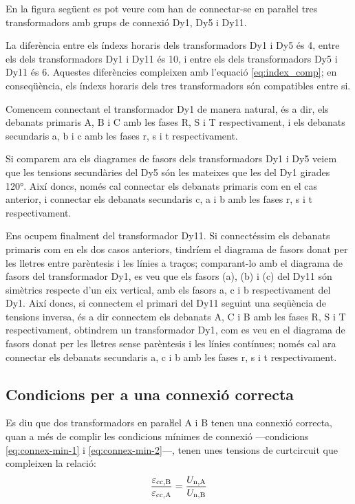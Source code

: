 \begin{exemple}[\ConnexParalDifIndex{}]
	\addcontentsxms{\ConnexParalDifIndex}
    En la figura següent es pot veure com han de connectar-se en paraŀlel tres transformadors amb grups de connexió Dy1, Dy5 i Dy11.

	 \begin{center}
		
	\end{center}

      La diferència entre els índexs horaris dels transformadors Dy1 i Dy5 és 4, entre els dels transformadors Dy1 i Dy11 és 10, i entre els dels transformadors Dy5 i Dy11 és 6. Aquestes diferències compleixen amb l'equació \eqref{eq:index_comp}; en conseqüència, els índexs horaris dels tres transformadors són compatibles entre si.


    Comencem connectant el  transformador Dy1 de manera natural, és a dir, els debanats primaris A, B i C amb les fases R, S i T respectivament, i els debanats secundaris a, b i c amb les fases r, s i t respectivament.

  

    Si comparem ara els diagrames de fasors dels transformadors Dy1 i Dy5 veiem que les tensions secundàries del Dy5 són les mateixes que les del Dy1 girades \ang{120}. Així doncs, només  cal connectar els debanats primaris com en el cas anterior, i connectar els debanats secundaris c, a i b amb les fases r, s i t respectivament.


    Ens ocupem finalment del transformador Dy11. Si connectéssim els debanats primaris com en els dos casos anteriors, tindríem el diagrama de fasors donat per les lletres entre parèntesis i les línies a traços; comparant-lo amb el diagrama de fasors del transformador Dy1, es veu que els fasors (a), (b) i (c) del Dy11 són simètrics respecte d'un eix vertical, amb els fasors a, c i b respectivament del Dy1. Així doncs, si connectem el primari del Dy11 seguint una seqüència de tensions inversa, és a dir connectem els debanats A, C i B amb les fases R, S i T respectivament, obtindrem un transformador Dy1, com es veu en el diagrama de fasors donat per les lletres sense parèntesis i les línies contínues; només cal ara connectar els debanats secundaris a, c i b amb les fases r, s i t respectivament.
\end{exemple}

\subsection{Condicions per a una connexió correcta}\label{sec:connex-correcta}
 Es diu que dos transformadors en paraŀlel  A i B tenen una connexió correcta, quan a més de complir les condicions mínimes de connexió ---condicions \eqref{eq:connex-min-1} i \eqref{eq:connex-min-2}---, tenen unes tensions de curtcircuit que compleixen la relació:
\begin{equation}
    \frac{\varepsilon_\mathrm{cc,B}}{\varepsilon_\mathrm{cc,A}} = \frac{U_\mathrm{n,A}}{U_\mathrm{n,B}}\label{eq:connex-correcta}
\end{equation}

